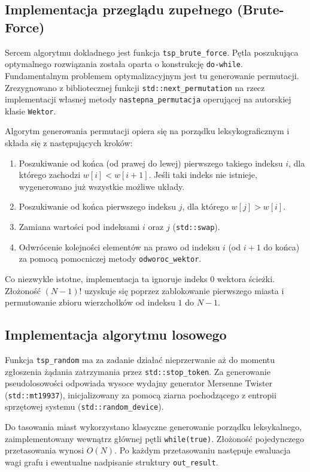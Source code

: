 \documentclass[12pt, a4paper]{article}
\begin{document}
	\subsection{Implementacja przeglądu zupełnego (Brute-Force)}
	Sercem algorytmu dokladnego jest funkcja \texttt{tsp\_brute\_force}. Pętla poszukująca optymalnego rozwiązania została oparta o konstrukcję \texttt{do-while}. Fundamentalnym problemem optymalizacyjnym jest tu generowanie permutacji. Zrezygnowano z bibliotecznej funkcji \texttt{std::next\_permutation} na rzecz implementacji własnej metody \texttt{nastepna\_permutacja} operującej na autorskiej klasie \texttt{Wektor}.
	
	Algorytm generowania permutacji opiera się na porządku leksykograficznym i składa się z następujących kroków:
	\begin{enumerate}
		\item Poszukiwanie od końca (od prawej do lewej) pierwszego takiego indeksu $i$, dla którego zachodzi $w[i] < w[i+1]$. Jeśli taki indeks nie istnieje, wygenerowano już wszystkie możliwe układy.
		\item Poszukiwanie od końca pierwszego indeksu $j$, dla którego $w[j] > w[i]$.
		\item Zamiana wartości pod indeksami $i$ oraz $j$ (\texttt{std::swap}).
		\item Odwrócenie kolejności elementów na prawo od indeksu $i$ (od $i+1$ do końca) za pomocą pomocniczej metody \texttt{odworoc\_wektor}.
	\end{enumerate}
	Co niezwykle istotne, implementacja ta ignoruje indeks $0$ wektora ścieżki. Złożoność $(N-1)!$ uzyskuje się poprzez zablokowanie pierwszego miasta i permutowanie zbioru wierzchołków od indeksu $1$ do $N-1$. 
	
	\subsection{Implementacja algorytmu losowego}
	Funkcja \texttt{tsp\_random} ma za zadanie działać nieprzerwanie aż do momentu zgłoszenia żądania zatrzymania przez \texttt{std::stop\_token}. Za generowanie pseudolosowości odpowiada wysoce wydajny generator Mersenne Twister (\texttt{std::mt19937}), inicjalizowany za pomocą ziarna pochodzącego z entropii sprzętowej systemu (\texttt{std::random\_device}).
	
	Do tasowania miast wykorzystano klasyczne generowanie porządku leksykalnego, zaimplementowany wewnątrz głównej pętli \texttt{while(true)}. Złożoność pojedynczego przetasowania wynosi $O(N)$. Po każdym przetasowaniu następuje ewaluacja wagi grafu i ewentualne nadpisanie struktury \texttt{out\_result}.
	
\end{document}
